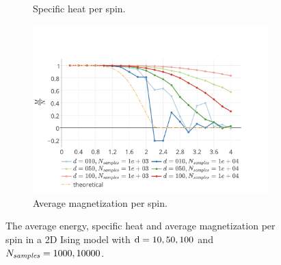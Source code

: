 \begin{figure}
\begin{subfigure}{\columnwidth}
			\caption{Specific heat per spin.}
			\label{fig:results:2D:specificHeat}
		\end{subfigure}	
		\begin{subfigure}{\columnwidth}
			\centering
			\includegraphics[width=\textwidth]{./img/2D/averageMagnetization}
			\caption{Average magnetization per spin.}
			\label{fig:results:2D:averageMagnetization}
		\end{subfigure}		
		\caption{The  average energy,  specific heat and  average magnetization per spin in a 2D Ising model with $\mathrm{d} = 10, 50, 100$ and $N_\textit{samples} = 1000, 10000$.}
		\label{fig:results:2D}
	\end{figure}